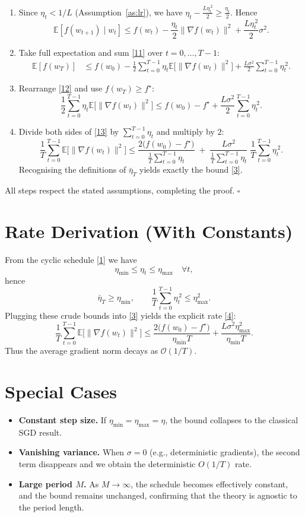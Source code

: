 \documentclass{article}
\newcommand{\E}{\mathbb{E}}
\begin{document}
\begin{enumerate}
\item[Step 7.] Since $\eta_t<1/L$ (Assumption~\ref{as:lr}), we have
$\eta_t-\frac{L\eta_t^{\,2}}{2}\ge\frac{\eta_t}{2}$.  Hence
\[
\E\!\left[f(w_{t+1})\mid w_t\right]
\le f(w_t)-\frac{\eta_t}{2}\|\nabla f(w_t)\|^2
+\frac{L\eta_t^{\,2}}{2}\sigma^2 .
\tag{11}
\]

\item[Step 8.] Take full expectation and sum \eqref{11} over $t=0,\dots,T-1$:
\[
\begin{aligned}
\E[f(w_T)] &\le f(w_0)-\frac12\sum_{t=0}^{T-1}\eta_t\E\!\big[\|\nabla f(w_t)\|^2\big]
+\frac{L\sigma^2}{2}\sum_{t=0}^{T-1}\eta_t^{\,2}.
\end{aligned}
\tag{12}
\]

\item[Step 9.] Rearrange \eqref{12} and use $f(w_T)\ge f^\star$:
\[
\frac12\sum_{t=0}^{T-1}\eta_t\E\!\big[\|\nabla f(w_t)\|^2\big]
\le f(w_0)-f^\star+\frac{L\sigma^2}{2}\sum_{t=0}^{T-1}\eta_t^{\,2}.
\tag{13}
\]

\item[Step 10.] Divide both sides of \eqref{13} by $\sum_{t=0}^{T-1}\eta_t$
and multiply by $2$:
\[
\frac{1}{T}\sum_{t=0}^{T-1}\E\!\big[\|\nabla f(w_t)\|^2\big]
\le
\frac{2\big(f(w_0)-f^\star\big)}{\displaystyle\frac{1}{T}\sum_{t=0}^{T-1}\eta_t}
\;+\;
\frac{L\sigma^2}{\displaystyle\frac{1}{T}\sum_{t=0}^{T-1}\eta_t}
\;\frac{1}{T}\sum_{t=0}^{T-1}\eta_t^{\,2}.
\tag{14}
\]
Recognising the definitions of $\bar\eta_T$ yields exactly the bound \eqref{3}.
\end{enumerate}
All steps respect the stated assumptions, completing the proof. $\square$

\section*{Rate Derivation (With Constants)}
From the cyclic schedule \eqref{1} we have
\[
\eta_{\min}\le\eta_t\le\eta_{\max}\quad\forall t,
\]
hence
\[
\bar\eta_T\ge\eta_{\min},\qquad
\frac{1}{T}\sum_{t=0}^{T-1}\eta_t^{\,2}\le\eta_{\max}^{2}.
\]
Plugging these crude bounds into \eqref{3} yields the explicit rate \eqref{4}:
\[
\frac{1}{T}\sum_{t=0}^{T-1}\E\!\big[\|\nabla f(w_t)\|^2\big]
\le
\frac{2\big(f(w_0)-f^\star\big)}{\eta_{\min}T}
+\frac{L\sigma^2\eta_{\max}^{2}}{\eta_{\min}T}.
\]
Thus the average gradient norm decays as $\mathcal{O}(1/T)$.

\section*{Special Cases}
\begin{itemize}
\item \textbf{Constant step size.} If $\eta_{\min}=\eta_{\max}=\eta$, the bound collapses to the classical SGD result.
\item \textbf{Vanishing variance.} When $\sigma=0$ (e.g., deterministic gradients), the second term disappears and we obtain the deterministic $O(1/T)$ rate.
\item \textbf{Large period $M$.} As $M\to\infty$, the schedule becomes effectively constant, and the bound remains unchanged, confirming that the theory is agnostic to the period length.
\end{itemize}
\end{document}

